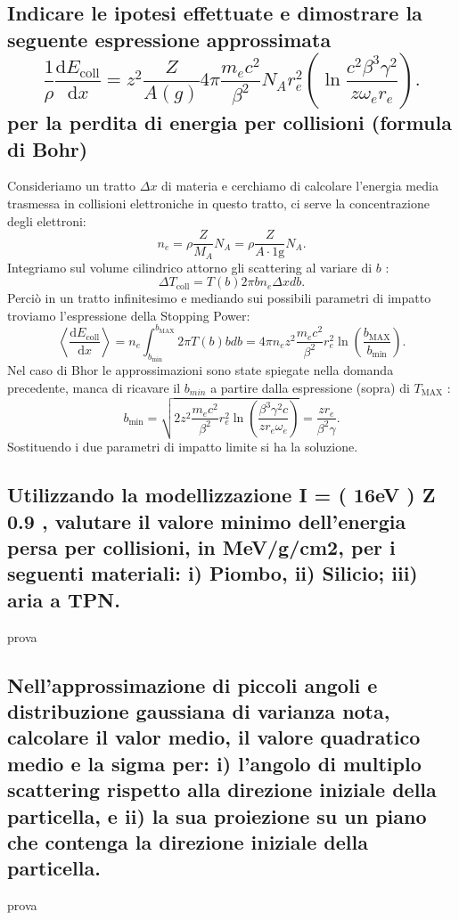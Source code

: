 \subsection[]{Indicare le ipotesi effettuate e dimostrare la seguente espressione approssimata
\[
	\frac{1}{\rho}\frac{\mbox{d} E_{\text{coll}}}{\mbox{d} x} = z^2 \frac{Z}{A\left( g \right) } 4 \pi \frac{m_e c^2}{\beta^2}N_A r_e^2\left( \ln \frac{c^2\beta^3\gamma^2}{z \omega_e r_e} \right) 
.\] 
 per la perdita di energia per collisioni (formula di Bohr)
}
\label{sec:4.b.15}
Consideriamo un tratto $\Delta x$ di materia e cerchiamo di calcolare l'energia media trasmessa in collisioni elettroniche in questo tratto, ci serve la concentrazione degli elettroni:
\[
	n_e =\rho \frac{Z}{M_A}N_A = \rho \frac{Z}{A\cdot 1\text{g}}N_A
.\] 
Integriamo sul volume cilindrico attorno gli scattering al variare di $b$ :
\[
	\Delta T_{\text{coll}} =T\left( b \right) 2 \pi b n_e \Delta x db
.\] 
Perciò in un tratto infinitesimo e mediando sui possibili parametri di impatto troviamo l'espressione della Stopping Power:
\[
	\left< \frac{\mbox{d} E_{\text{coll}}}{\mbox{d} x} \right> = n_e \int_{b_{\text{min}}}^{b_{\text{MAX}}} 2 \pi T\left( b \right) b db = 
	4 \pi n_e z^2 \frac{m_e c^2}{\beta^2} r_e^2 \ln\left( \frac{b_{\text{MAX}}}{b_{\text{min}}} \right) 
.\] 
Nel caso di Bhor le approssimazioni sono state spiegate nella domanda precedente, manca di ricavare il $b_{min}$ a partire dalla espressione (sopra) di $T_{\text{MAX}}$ :
\[
	b_{\text{min}}= \sqrt{2z^2 \frac{m_e c^2}{\beta^2}r_e^2 \ln\left( \frac{\beta^3\gamma^2c}{zr_e\omega_e} \right) } =
	\frac{zr_e}{\beta^2 \gamma}
.\] 	
Sostituendo i due parametri di impatto limite si ha la soluzione.

\subsection[]{Utilizzando la modellizzazione I = ( 16eV ) Z 0.9 , valutare il valore minimo dell’energia persa per collisioni, in MeV/g/cm2, per i seguenti materiali: i) Piombo, ii) Silicio; iii) aria a TPN.
}prova
\label{sec:4.b.16}
\subsection[]{Nell'approssimazione di piccoli angoli e distribuzione gaussiana di varianza nota, calcolare il valor medio, il valore quadratico medio e la sigma per: i) l'angolo di multiplo scattering rispetto alla direzione iniziale della particella, e ii) la sua proiezione su un piano che contenga la direzione iniziale della particella.
}prova
\label{sec:4.b.17}
